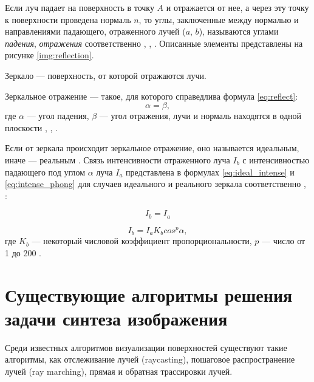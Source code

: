 Если луч падает на поверхность в точку $A$ и отражается от нее, а через эту точку к поверхности проведена нормаль $n$, то углы, заключенные между нормалью и направлениями падающего, отраженного лучей ($a$, $b$), называются углами \textit{падения}, \textit{отражения} соответственно \cite{тюрин2005физика}, \cite{оптика20036}, \cite{rodionov}.
Описанные элементы представлены на рисунке \ref{img:reflection}.


Зеркало --- поверхность, от которой отражаются лучи.

Зеркальное отражение --- такое, для которого справедлива формула \ref{eq:reflect}:
\begin{equation}\label{eq:reflect}
	\alpha=\beta,
\end{equation}
где $\alpha$ --- угол падения, $\beta$ --- угол отражения, лучи и нормаль находятся в одной плоскости \cite{порев2002компьютерная}, \cite{оптика20036}, \cite{rodionov}.

Если от зеркала происходит зеркальное отражение, оно называется идеальным, иначе --- реальным \cite{порев2002компьютерная}. Связь интенсивности отраженного луча $I_b$ с интенсивностью падающего под углом $\alpha$ луча $I_a$ представлена в формулах \ref{eq:ideal_intense} и \ref{eq:intense_phong} для случаев идеального и реального зеркала соответственно \cite{порев2002компьютерная}, \cite{оптика20036}:

\begin{equation}\label{eq:ideal_intense}
	I_b=I_a
\end{equation}

\begin{equation}\label{eq:intense_phong}
	I_b=I_a K_b cos^p{\alpha},
\end{equation}
где $K_b$ --- некоторый числовой коэффициент пропорциональности, $p$ --- число от 1 до 200 \cite{порев2002компьютерная}.


\section{Существующие алгоритмы решения задачи синтеза изображения}

Среди известных алгоритмов визуализации поверхностей существуют такие алгоритмы, как отслеживание лучей (raycasting), пошаговое распространение лучей (ray marching), прямая и обратная трассировки лучей.

